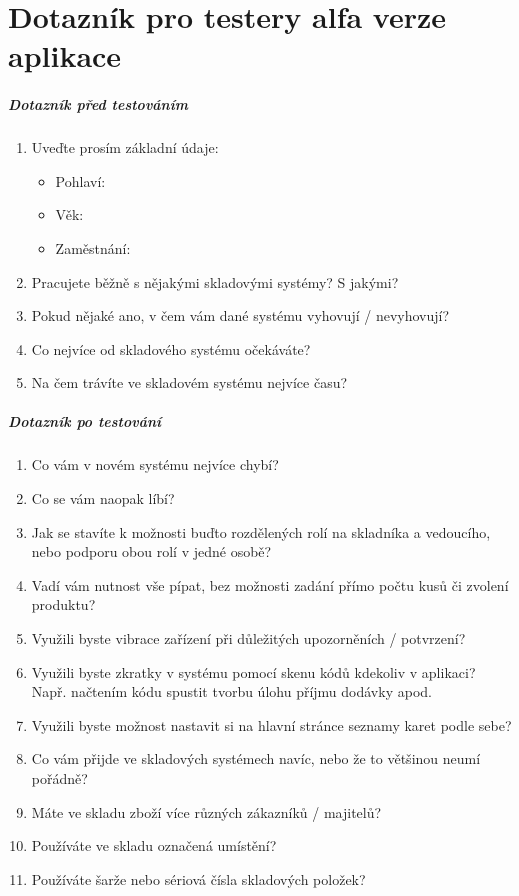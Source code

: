 \chapter{Dotazník pro testery alfa verze aplikace} \label{ap:testing_questions}

\paragraph{Dotazník před testováním}

\begin{enumerate}
	\item Uveďte prosím základní údaje:
	\begin{itemize}
		\item Pohlaví:
		\item Věk:
		\item Zaměstnání:
	\end{itemize}
	\item Pracujete běžně s nějakými skladovými systémy? S jakými?
	\item Pokud nějaké ano, v čem vám dané systému vyhovují / nevyhovují?
	\item Co nejvíce od skladového systému očekáváte?
	\item Na čem trávíte ve skladovém systému nejvíce času?
\end{enumerate}

\paragraph{Dotazník po testování}

\begin{enumerate}
	\item Co vám v novém systému nejvíce chybí?
	\item Co se vám naopak líbí?
	\item Jak se stavíte k možnosti buďto rozdělených rolí na skladníka a vedoucího, nebo podporu obou rolí v jedné osobě?
	\item Vadí vám nutnost vše pípat, bez možnosti zadání přímo počtu kusů či zvolení produktu? 
	\item Využili byste vibrace zařízení při důležitých upozorněních / potvrzení?
	\item Využili byste zkratky v systému pomocí skenu kódů kdekoliv v aplikaci? Např. načtením kódu spustit tvorbu úlohu příjmu dodávky apod. 
	\item Využili byste možnost nastavit si na hlavní stránce seznamy karet podle sebe?
	\item Co vám přijde ve skladových systémech navíc, nebo že to většinou neumí pořádně?
	\item Máte ve skladu zboží více různých zákazníků / majitelů?
	\item Používáte ve skladu označená umístění?
	\item Používáte šarže nebo sériová čísla skladových položek?
\end{enumerate}
